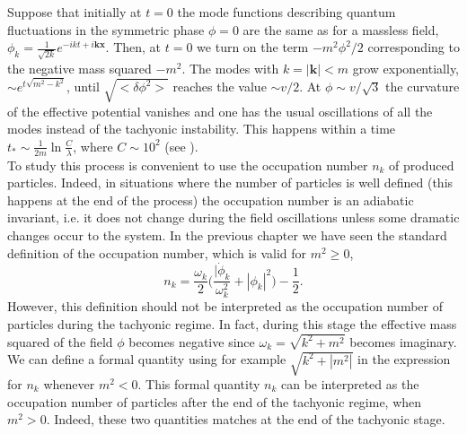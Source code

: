 \documentclass[11pt,a4paper,twoside]{book}
\begin{document}
Suppose that initially at $ t=0 $  the mode functions describing quantum fluctuations in the symmetric phase $\phi=0$ are the same as for a massless field, $\phi_{k}=\frac{1}{\sqrt{2k}}e^{-ikt + i \textbf{k}\textbf{x}}$. Then, at $ t=0 $ we turn on the term $ -m^{2}\phi^{2}/2 $ corresponding to the negative mass squared $ -m^{2} $. The modes with $ k = |\textbf{k}| < m  $ grow exponentially, $ \sim e^{t\sqrt{m^{2} - k^{2}}} $, until $ \sqrt{<\delta \phi^{2}>} $ reaches the value $\sim v/2$.  At $\phi \sim v/\sqrt{3}$ the curvature of the effective potential vanishes and one has the usual oscillations of all the modes instead of the tachyonic instability. This happens within a time $ t_{*} \sim \frac{1}{2m}\ln \frac{C}{\lambda} $, where $ C\sim 10^{2} $ (see  \cite{Chap5:TachyonicInstability}).\\
To study this process is convenient to use the occupation number $ n_{k} $ of produced particles. Indeed, in situations where the number of particles is well defined (this happens at the end of the process) the occupation number is an adiabatic invariant, i.e. it does not change during the field oscillations unless some dramatic changes occur to the system. In the previous chapter we have seen the standard definition of the occupation number, which is valid for $ m^{2} \ge 0 $,
\begin{equation}
\label{Chap5:TachyonicModel_occupationNumber}
n_{k}=\frac{\omega_{k}}{2}\Bigg(\frac{|\dot{\phi}_{k}}{\omega_{k}^{2}} + |\phi_{k}|^{2}\Bigg) - \frac{1}{2}.
\end{equation}
However, this definition should not be interpreted as the occupation number of particles during the tachyonic regime. In fact, during this stage the effective mass squared of the field $\phi$ becomes negative since $\omega_{k} = \sqrt{k^{2} + m^{2}}$ becomes imaginary. We can define a formal quantity using for example $ \sqrt{k^{2} + |m^{2}|} $ in the expression for $ n_{k} $ whenever $ m^{2} < 0 $. This formal quantity $ n_{k} $ can be interpreted  as the occupation number of particles after the end of the tachyonic regime, when $ m^{2} > 0 $. Indeed, these two quantities matches at the end of the tachyonic stage.\\
\end{document}
